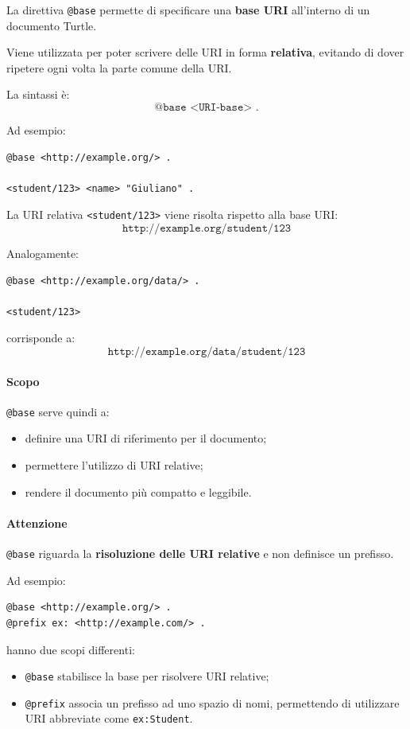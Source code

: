 La direttiva \texttt{@base} permette di specificare una \textbf{base URI} all'interno di un documento Turtle.

Viene utilizzata per poter scrivere delle URI in forma \textbf{relativa}, evitando di dover ripetere ogni volta la parte comune della URI.

La sintassi è:
\[
\texttt{@base <URI-base> .}
\]

Ad esempio:
\begin{verbatim}
@base <http://example.org/> .

<student/123> <name> "Giuliano" .
\end{verbatim}

La URI relativa \texttt{<student/123>} viene risolta rispetto alla base URI:
\[
\texttt{http://example.org/student/123}
\]

Analogamente:
\begin{verbatim}
@base <http://example.org/data/> .

<student/123>
\end{verbatim}

corrisponde a:
\[
\texttt{http://example.org/data/student/123}
\]

\paragraph{Scopo}
\texttt{@base} serve quindi a:
\begin{itemize}
    \item definire una URI di riferimento per il documento;
    \item permettere l'utilizzo di URI relative;
    \item rendere il documento più compatto e leggibile.
\end{itemize}

\paragraph{Attenzione}
\texttt{@base} riguarda la \textbf{risoluzione delle URI relative} e non definisce un prefisso.

Ad esempio:

\begin{verbatim}
@base <http://example.org/> .
@prefix ex: <http://example.com/> .
\end{verbatim}

hanno due scopi differenti:
\begin{itemize}
    \item \texttt{@base} stabilisce la base per risolvere URI relative;
    \item \texttt{@prefix} associa un prefisso ad uno spazio di nomi, permettendo di utilizzare URI abbreviate come \texttt{ex:Student}.
\end{itemize}



